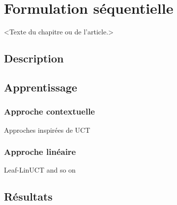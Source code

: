\chapter{Formulation séquentielle}
\label{chap:mcts}                   %

<Texte du chapitre ou de l'article.>

\section{Description}

\section{Apprentissage}

\subsection{Approche contextuelle}

Approches inspirées de UCT

\subsection{Approche linéaire}

Leaf-LinUCT and so on

\section{Résultats}
